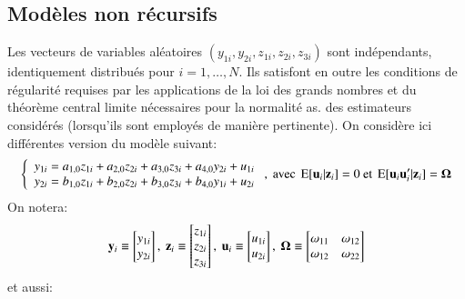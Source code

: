 \subsection{Modèles non récursifs}
Les vecteurs de variables aléatoires $(y_{1i} , y_{2i} , z_{1i} , z_{2i} , z_{3i})$ sont indépendants, identiquement
distribués pour $i=1,\ldots, N$. Ils satisfont en outre les conditions de régularité requises 
par les applications de la loi des grands nombres et du théorème central limite nécessaires 
pour la normalité as. des estimateurs considérés (lorsqu’ils sont employés de manière pertinente).
On considère ici différentes version du modèle suivant:
\begin{align}
    \left\{
        \begin{array}{l}
    y_{1i} =  a_{1,0}z_{1i}+ a_{2,0}z_{2i} + a_{3,0}z_{3i} + a_{4,0}y_{2i} + u_{1i}\\
    y_{2i} = b_{1,0}z_{1i} + b_{2,0}z_{2i} + b_{3,0}z_{3i} + b_{4,0}y_{1i} + u_{2i}
        \end{array}
        \right. , 
        \ \text{avec} \ \Exp[\boldu_i|\boldz_i] = 0 \ \text{et} \ \Exp[\boldu_i\boldu_i^\prime|\boldz_i]=\boldOmega
        \label{eq3}
\end{align}
    On notera:
\[
    \boldy_i \equiv \begin{bmatrix}
        y_{1i}\\
        y_{2i}
    \end{bmatrix}
    , \
    \boldz_i \equiv \begin{bmatrix}
        z_{1i}\\
        z_{2i}\\
        z_{3i}
    \end{bmatrix}
    , \
    \boldu_i \equiv \begin{bmatrix}
        u_{1i}\\
        u_{2i}
    \end{bmatrix}
    , \ 
    \boldOmega \equiv \begin{bmatrix}
        \omega_{11} & \omega_{12}\\
        \omega_{12} & \omega_{22}
    \end{bmatrix}
    \]
    et aussi:
